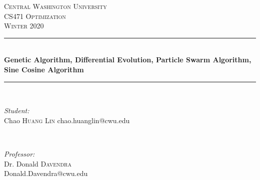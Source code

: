 \documentclass[12pt]{article}
\begin{document}
    
    \begin{titlepage}
        
        \newcommand{\HRule}{\rule{\linewidth}{0.5mm}} %
        
        \center %
        
        
        \textsc{\LARGE Central Washington University}\\[1.5cm] %
        \textsc{\Large CS471 Optimization}\\[0.5cm] %
        \textsc{\large Winter 2020}\\[0.5cm] %
        
        
        \HRule \\[0.4cm]
        { \huge \bfseries Genetic Algorithm, Differential Evolution, Particle Swarm Algorithm, Sine Cosine Algorithm}\\[0.2cm] %
        \HRule \\[1cm]
        
        
        \begin{minipage}{0.5\textwidth}
            \begin{flushleft} \large
                \emph{Student:}\\
                Chao \textsc{Huang Lin} chao.huanglin@cwu.edu
                
                
            \end{flushleft}
        \end{minipage}
        ~
        \begin{minipage}{0.45\textwidth}
            \begin{flushright} \large
                \emph{Professor:} \\
                Dr. Donald \textsc{Davendra}\\ %
                Donald.Davendra@cwu.edu
            \end{flushright}
        \end{minipage}\\[0.5cm]
        

\end{titlepage}
\end{document}
